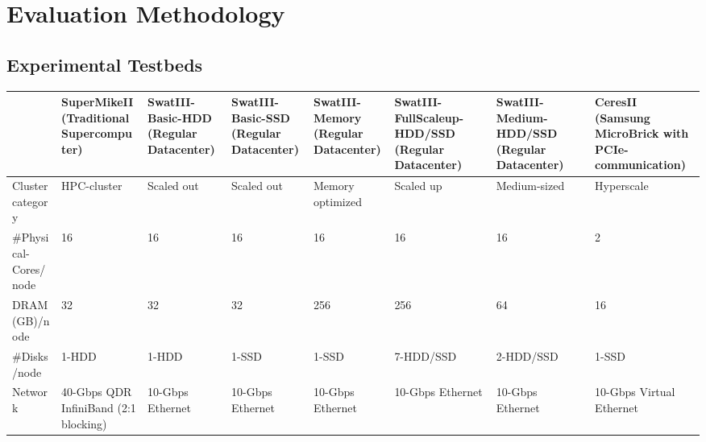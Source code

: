 \documentclass[10pt, conference, compsocconf]{IEEEtran}
\begin{document}
\section {Evaluation Methodology} \label{EvaluationMethodology}
\subsection {Experimental Testbeds}
\begin{table}
\begin{center}
    \begin{tabular}{ |p{3.2cm} | p{1.6cm} | p{1.6cm} | p{1.6cm} | p{1.9cm} | p{1.6cm} | p{1.6cm}| p{1.9cm}|} \hline
    & SuperMikeII (Traditional Supercomputer) & SwatIII-Basic-HDD (Regular Datacenter) & SwatIII-Basic-SSD (Regular Datacenter)  & SwatIII-Memory (Regular Datacenter) & SwatIII-FullScaleup-HDD/SSD (Regular Datacenter) & SwatIII-Medium-HDD/SSD (Regular Datacenter) & CeresII (Samsung MicroBrick with PCIe-communication) \\ \hline
    Cluster category & HPC-cluster & Scaled out & Scaled out & Memory optimized & Scaled up & Medium-sized & Hyperscale\\ \hline  
    \#Physical-Cores/node & 16 & 16 & 16 & 16 & 16 & 16 & 2 \\ \hline %
    DRAM(GB)/node & 32 & 32 & 32 & 256 & 256 & 64 & 16  \\ \hline
    \#Disks/node & 1-HDD & 1-HDD & 1-SSD & 1-SSD & 7-HDD/SSD & 2-HDD/SSD & 1-SSD \\ \hline
    Network & 40-Gbps QDR InfiniBand (2:1 blocking) & 10-Gbps Ethernet & 10-Gbps Ethernet & 10-Gbps Ethernet & 10-Gbps Ethernet & 10-Gbps Ethernet & 10-Gbps Virtual Ethernet\\ \hline %

\end{tabular}
\end{center}
\end{table}
\end{document}
